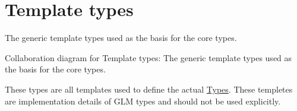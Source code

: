 \hypertarget{group__core__template}{}\section{Template types}
\label{group__core__template}


The generic template types used as the basis for the core types.  


Collaboration diagram for Template types\+:
The generic template types used as the basis for the core types. 

These types are all templates used to define the actual \hyperlink{group__core__types}{Types}. These templetes are implementation details of G\+L\+M types and should not be used explicitly. 